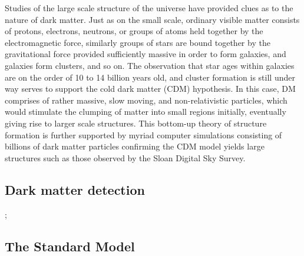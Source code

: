 Studies of the large scale structure of the universe have provided clues as to the nature of dark matter. Just as on the small scale, ordinary visible matter consists of protons, electrons, neutrons, or groups of atoms held together by the electromagnetic force, similarly groups of stars are bound together by the gravitational force provided sufficiently massive in order to form galaxies, and galaxies form clusters, and so on. The observation that star ages within galaxies are on the order of 10 to 14 billion years old, and cluster formation is still under way serves to support the cold dark matter (CDM) hypothesis. In this case, DM comprises of rather massive, slow moving, and non-relativistic particles, which would stimulate the clumping of matter into small regions initially, eventually giving rise to larger scale structures. This bottom-up theory of structure formation is further supported by myriad computer simulations consisting of billions of dark matter particles confirming the CDM model yields large structures such as those observed by the Sloan Digital Sky Survey. 

\subsection{Dark matter detection}
\label{subsec:DMsearches}

\begin{center}
  ;
\end{center}

\subsection{The Standard Model}
\label{subsec:SM}


